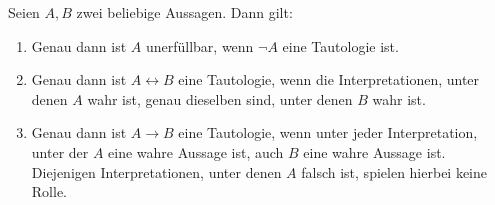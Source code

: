  
\begin{satz} \label{tauto}
    Seien $A,B$ zwei beliebige Aussagen. Dann gilt:
    \begin{enumerate}
        \item Genau dann ist $A$ unerfüllbar, wenn $\neg A$ eine Tautologie ist.
        \item Genau dann ist $A\leftrightarrow B$ eine Tautologie, wenn die Interpretationen, unter denen $A$ wahr ist, genau dieselben sind, unter denen $B$ wahr ist.
        \item Genau dann ist $A\to B$ eine Tautologie, wenn unter jeder Interpretation, unter der $A$ eine wahre Aussage ist, auch $B$ eine wahre Aussage ist. Diejenigen Interpretationen, unter denen $A$ falsch ist, spielen hierbei keine Rolle.
    \end{enumerate}
\end{satz}


